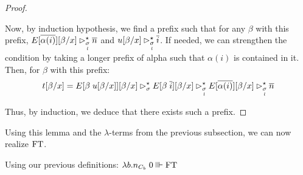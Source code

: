 \documentclass[a4paper,UKenglish,cleveref, autoref, thm-restate]{lipics-v2021}
\begin{document}
\begin{proof}
\begin{itemize}
    Now, by induction hypothesis, we find a prefix such that for any $\beta$ with this prefix, $E[\overline{\alpha(i)}][\beta/x] \rhd^{\star}_{\underset{l}{\sigma}} \overline n$ and $u[\beta/x] \rhd^{\star}_{\underset{l}{\sigma}} \overline i$. If needed, we can strengthen the condition by taking a longer prefix of alpha such that $\alpha(i)$ is contained in it. Then, for $\beta$ with this prefix:
    \[t[\beta/x] = E[\beta\;u[\beta/x]][\beta/x] \rhd^{\star}_{\sigma} E[\beta\;\overline i][\beta/x]\rhd^{\star}_{\underset{l}{\sigma}} E[\overline{\alpha(i)}][\beta/x]\rhd^{\star}_{\underset{l}{\sigma}} \overline{n}\]
  \end{itemize}

  Thus, by induction, we deduce that there exists such a prefix.
\end{proof}

Using this lemma and the $\lambda$-terms from the previous subsection, we can now realize $\mathrm{FT}$.

\begin{theorem}\label{thm:FT}
  Using our previous definitions: $\lambda b. n_{C_b}\;0 \Vvdash \mathrm{FT}$
\end{theorem}
\end{document}
